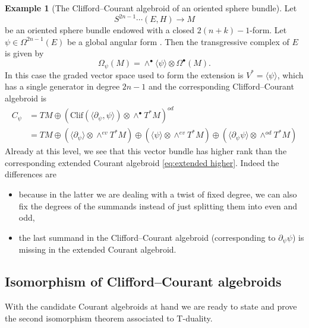 \documentclass[12pt,twoside]{article}
\theoremstyle{plain}
\theoremstyle{definition}
\newtheorem{example}[theorem]{Example}
\newcommand{\Clif}{\mathrm{Clif}}
\newcommand{\del}{\text{$\partial$}}
\newcommand{\tensor}{\otimes}
\newcommand{\IP}[1]{\langle #1 \rangle}
\numberwithin{equation}{section}
\begin{document}
\begin{example}[The Clifford--Courant algebroid of an oriented sphere bundle]

Let
\[S^{2n-1}\cdots (E,H) \to M\]
 be an oriented sphere bundle endowed with a closed $2(n+k)-1$-form. Let $\psi \in \Omega^{2n-1}(E)$ be a global angular form%
 . Then the transgressive complex of $E$ is given by
\[\Omega_\psi(M) = \wedge^\bullet\IP{\psi}\tensor \Omega^\bullet(M).\]
In this case the graded vector space used to form the extension is $V^* = \IP{\psi}$, which has a single generator in degree $2n-1$ and the corresponding Clifford--Courant algebroid is
\begin{align*}C_\psi & = TM \oplus (\Clif(\IP{\del_\psi,\psi})\tensor \wedge^\bullet T^*M)^{od}\\
&= TM \oplus  (\IP{\del_\psi}\tensor\wedge^{ev}T^*M)\oplus ( \IP{\psi}\tensor \wedge^{ev} T^*M) \oplus (\IP{\del_\psi \psi} \tensor \wedge^{od}T^*M)
\end{align*}
Already at this level, we see that this vector bundle has higher rank than the corresponding extended Courant algebroid \eqref{eq:extended higher}. Indeed the differences are
\begin{itemize}
\item because in the latter we are dealing with a twist of fixed degree, we can also fix the degrees of the summands instead of just splitting them into even and odd,
\item the last summand in the Clifford--Courant algebroid (corresponding to $\del_\psi \psi$) is missing in the extended Courant algebroid.
\end{itemize}
\end{example}

  
\subsection{Isomorphism of Clifford--Courant algebroids}

With the candidate Courant algebroids at hand we are ready to state and prove the second isomorphism theorem associated to T-duality.
\end{document}
